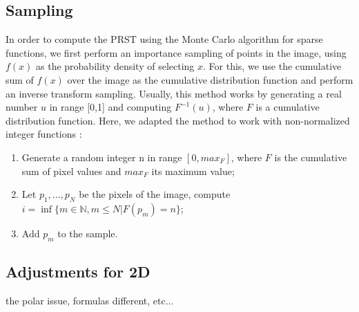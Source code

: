 \documentclass[10pt,a4paper]{article}			%
\begin{document}
	\subsection{Sampling}
In order to compute the PRST using the Monte Carlo algorithm for sparse functions, we first perform an importance sampling of points in the image, using $f(x)$  as the probability density of selecting $x$. For this, we use the cumulative sum of $f(x)$ over the image as the cumulative distribution function and perform an inverse transform sampling. Usually, this method works by generating a real number $u$ in range [0,1] and computing $F^{-1}(u)$, where $F$ is a cumulative distribution function. Here, we adapted the method to work with non-normalized integer functions :
\begin{enumerate}
\item Generate a random integer n in range $[0,max_F]$, where $F$ is the cumulative sum of pixel values and $max_F$ its maximum value;
\item Let $p_1,...,p_N$ be the pixels of the image, compute $i=\inf\{m\in \mathbb{N}, m\leq N |  F(p_m) = n\}$;
\item Add $p_m$ to the sample.
\end{enumerate}



	\subsection{Adjustments for 2D}
	
	the polar issue, formulas different, etc...
\end{document}
